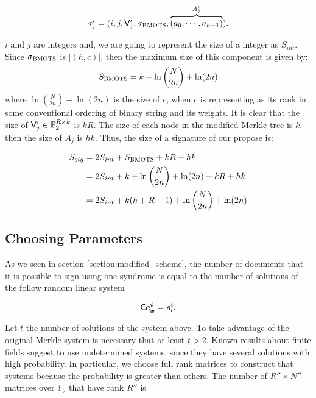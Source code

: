\[
	\sigma_{j}^i=(i,j,\normalfont\textsf{V}_j^i,\sigma_{\textsc{BMOTS}},\overbrace{(a_0,\cdots,a_{h-1})}^{A_j^i}).
\]

$i$ and $j$ are integers and, we are going to represent the size of a integer as $S_{int}$. Since $\sigma_{\textsc{BMOTS}}$ is $|(h,c)|$, then the maximum size of this component is given by:
\begin{equation}
S_{\textsc{BMOTS}} = k + \ln{{N}\choose{2n}} + \ln(2n)
\label{chap:7:eq:c_sig}
\end{equation}
where $\ln{{N}\choose{2n}} + \ln(2n)$ is the size of $c$, when $c$ is representing as its rank in some conventional ordering of binary string and its weights. 
It is clear that the size of $\normalfont\textsf{V}_j^i \in \mathbb{F}_2^{R\times k}$ is $kR$. The size of each node in the modified Merkle tree is $k$, then the size of $A_j$ is $hk$. Thus, the size of a signature of our propose is:

\begin{equation}
\begin{split}
    S_{sig} &= 2S_{int} + S_{\textsc{BMOTS}} + kR + hk\\
    &= 2S_{int} + k + \ln{{N}\choose{2n}} + \ln(2n) + kR + hk\\
    &= 2S_{int} + k(h+R+1) + \ln{{N}\choose{2n}} + \ln(2n)
\end{split}
\end{equation}


\subsection{Choosing Parameters}
As we seen in section \ref{section:modified_scheme}, the number of documents that it is possible to sign using one syndrome is equal to the number of solutions of the follow random linear system 

\begin{equation}
     \normalfont\textsf{C} \boldsymbol{e^i_x} = \boldsymbol{s}^i_l.
     \label{eq:cxs}
\end{equation}

Let $t$ the number of solutions of the system above. To take advantage of the original Merkle system is necessary that at least $t>2$. Known results about finite fields suggest to use undetermined systems, since they have several solutions with high probability. In particular, we choose full rank matrices to construct that systems because the probability is greater than others. The number of $R''\times N''$ matrices over $\mathbb{F}_2$ that have rank $R''$ is

